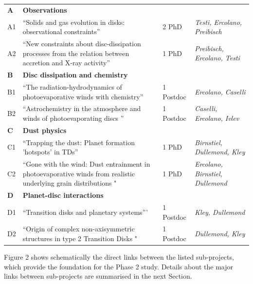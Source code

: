 \documentclass[12pt]{article}
\begin{document}
\noindent
\begin{tabular}{p{1cm}p{8cm}p{2.0cm}p{3.9cm}}
\hline
{\bf A} & {\bf Observations} & & \\ 
A1 & ``Solids and gas evolution in disks: observational constraints'' & 2 PhD & {\em Testi, Ercolano, Preibisch}\\
A2 & ``New constraints about disc-dissipation processes from the relation between accretion and X-ray activity'' & 1 PhD & {\em Preibisch, Ercolano, Testi}\\
\hline
{\bf B} & {\bf Disc dissipation and chemistry} & & \\ 
B1 & ``The radiation-hydrodynamics of photoevaporative winds with chemistry'' & 1 Postdoc & {\em Ercolano, Caselli}\\
B2 & ``Astrochemistry in the atmosphere and winds of photoevaporating discs '' & 1 Postdoc & {\em
                                                              Caselli,
                                                              Ercolano,
                                                              Ivlev}\\
\hline
{\bf C} & {\bf Dust physics} & & \\ 
C1 & ``Trapping the dust: Planet formation 'hotspots' in TDs'' & 1 PhD
                               & {\em Birnstiel, Dullemond, Kley}\\
C2 & ``Gone with the wind: Dust entrainment in photoevaporative winds
     from realistic underlying grain distributions "& 1 PhD & {\em
                                                              Ercolano,
                                                              Birnstiel,
                                                              Dullemond}\\
\hline
{\bf D} & {\bf Planet-disc interactions} & & \\ 
D1 & ``Transition disks and planetary systems''' & 1 Postdoc & {\em Kley, Dullemond}\\
D2 & ``Origin of complex non-axisymmetric structures in type 2
     Transition Disks "& 1 Postdoc & {\em Dullemond, Kley}\\
\hline
\end{tabular}
\vspace{1.5em}

Figure 2 shows schematically the direct links between the listed sub-projects, which provide the foundation for the Phase 2 study. Details about the major links between sub-projects are summarised in the next Section. 
\end{document}
